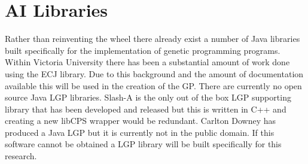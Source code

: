 \section{AI Libraries}
Rather than reinventing the wheel there already exist a number of Java libraries built specifically for the implementation of genetic programming programs. Within Victoria University there has been a substantial amount of work done using the ECJ library. Due to this background and the amount of documentation available this will be used in the creation of the GP. There are currently no open source Java LGP libraries. Slash-A is the only out of the box LGP supporting library that has been developed and released but this is written in C++ and creating a new libCPS wrapper would be redundant. Carlton Downey has produced a Java LGP but it is currently not in the public domain. If this software cannot be obtained a LGP library will be built specifically for this research.